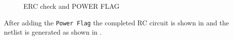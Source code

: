 \begin{itemize}
\begin{figure}[!htp]
    \centering
     \hfill
    \caption{ERC check and POWER FLAG}
\end{figure}

After adding the {\tt Power Flag} the completed RC circuit is shown in  and the netlist is generated as shown in .



\end{itemize}
